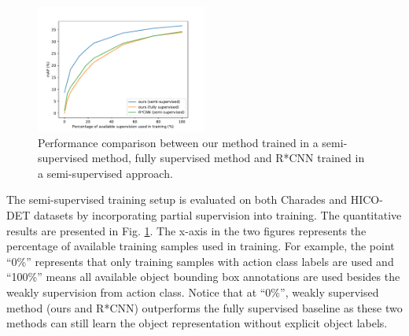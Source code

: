 \begin{figure}
\includegraphics[width=0.5\textwidth]{figures/ratio_exp.pdf}
\caption{Performance comparison between our method trained in a semi-supervised method, fully supervised method and R*CNN trained in a semi-supervised approach.}
\label{fig:semi-supervision}
\end{figure} 

The semi-supervised training setup is evaluated on both Charades and HICO-DET datasets by incorporating partial supervision into training. The quantitative results are presented in Fig. \ref{fig:semi-supervision}. The x-axis in the two figures represents the percentage of available training samples used in training. For example, the point ``0\%'' represents that only training samples with action class labels are used and ``100\%'' means all available object bounding box annotations are used besides the weakly supervision from action class. Notice that at ``0\%'', weakly supervised method (ours and R*CNN) outperforms the fully supervised baseline as these two methods can still learn the object representation without explicit object labels. 

